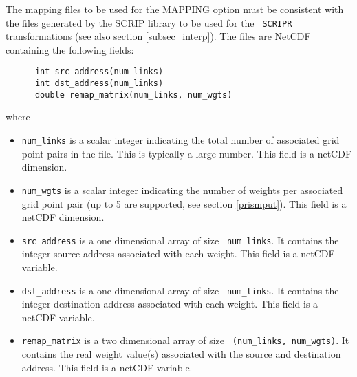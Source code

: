 The mapping files to be used for the MAPPING option must be consistent
with the files generated by the SCRIP library to be used for the {\tt
  SCRIPR} transformations (see also section \ref{subsec_interp}). The
files are NetCDF containing the following fields:
\begin{verbatim}
      int src_address(num_links) 
      int dst_address(num_links) 
      double remap_matrix(num_links, num_wgts) 
\end{verbatim}
where
\begin{itemize}
\item {\tt num\_links} is a scalar integer indicating the total number
  of associated grid point pairs in the file.  This is typically a
  large number.  This field is a netCDF dimension.
\item {\tt num\_wgts} is a scalar integer indicating the number of
  weights per associated grid point pair (up to 5 are supported, see
  section \ref{prismput}).  This field is a netCDF dimension.
\item {\tt src\_address} is a one dimensional array of size {\tt
    num\_links}.  It contains the integer source address associated
  with each weight.  This field is a netCDF variable.
\item {\tt dst\_address} is a one dimensional array of size {\tt
    num\_links}.  It contains the integer destination address
  associated with each weight.  This field is a netCDF variable.
\item {\tt remap\_matrix} is a two dimensional array of size {\tt
    (num\_links, num\_wgts)}.  It contains the real weight value(s)
  associated with the source and destination address.  This field is a
  netCDF variable.
\end{itemize}
